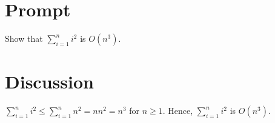 \documentclass[11pt]{article}
\begin{document}
    \section{Prompt}

Show that $\sum^n_{i=1} i^2$ is $O(n^3)$.

    \pagebreak

    \section{Discussion}

$\sum^n_{i=1} i^2 \leq \sum^n_{i=1} n^2 = n n^2 = n^3$ for $n \geq 1$. Hence, $\sum^n_{i=1} i^2$ is $O(n^3)$.
\end{document}
